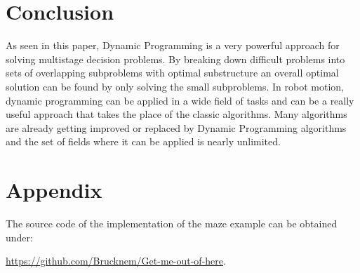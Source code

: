 \documentclass[conference]{IEEEtran}
\begin{document}
\section{Conclusion}
As seen in this paper, Dynamic Programming is a very powerful approach for solving multistage decision problems. By breaking down difficult problems into sets of overlapping subproblems with optimal substructure an overall optimal solution can be found by only solving the small subproblems. In robot motion, dynamic programming can be applied in a wide field of tasks and can be a really useful approach that takes the place of the classic algorithms.
Many algorithms are already getting improved or replaced by Dynamic Programming algorithms and the set of fields where it can be applied is nearly unlimited.

\section{Appendix}
The source code of the implementation of the maze example can be obtained under:
\begin{center}
\url{https://github.com/Brucknem/Get-me-out-of-here}.
\end{center}


\end{document}

